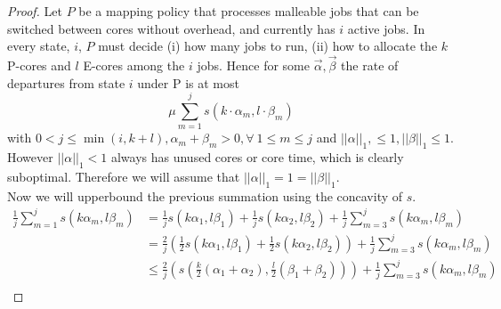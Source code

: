 \begin{proof}
Let $P$ be a mapping policy that processes malleable jobs that can be switched between cores without overhead,
and currently has $i$ active jobs. In every state, $i$, $P$ must decide (i) how many jobs to run,
(ii) how to allocate the $k$ P-cores and $l$ E-cores among the $i$ jobs. Hence for some $\vec{\alpha},
\vec{\beta}$ the rate of departures from state $i$ under P is at most
    $$\mu \sum_{m=1}^j s(k\cdot \alpha_m, l \cdot \beta_m)$$
with $0 < j \leq \min(i, k+l), \alpha_m + \beta_m > 0, \forall \ 1 \leq m \leq j$ and $||\alpha||_1, \leq 1, ||\beta||_1 \leq 1$. However $||\alpha||_1 < 1$ always has unused cores or core time, which is clearly suboptimal. Therefore we will assume that $||\alpha||_1 = 1 = ||\beta||_1$.\\
Now we will upperbound the previous summation using the concavity of $s$.
\begin{align*}
    \frac{1}{j}\sum_{m=1}^j s (k\alpha_m, l \beta_m) &= \frac{1}{j} s(k \alpha_1, l\beta_1) + \frac{1}{j} s(k \alpha_2, l\beta_2) + \frac{1}{j}\sum_{m=3}^j s (k\alpha_m, l \beta_m)\\
    &= \frac{2}{j}\left(\frac{1}{2} s(k \alpha_1, l\beta_1) + \frac{1}{2} s(k \alpha_2, l\beta_2)\right) + \frac{1}{j}\sum_{m=3}^j s (k\alpha_m, l \beta_m)\\
    &\leq \frac{2}{j}\left(s(\frac{k}{2}(\alpha_1 +\alpha_2), \frac{l}{2}(\beta_1 + \beta_2))\right) + \frac{1}{j}\sum_{m=3}^j s (k\alpha_m, l \beta_m)\\

\end{align*}
\end{proof}
